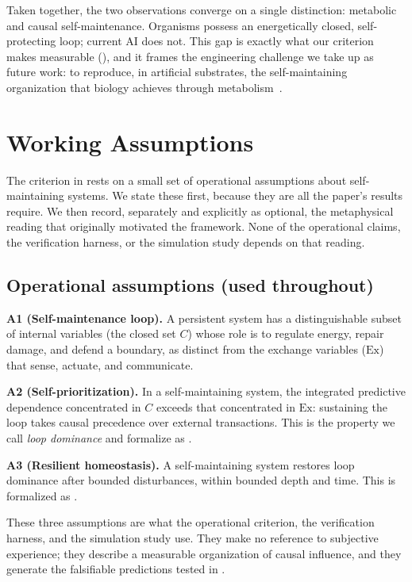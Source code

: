 \documentclass[11pt]{article}
\begin{document}
Taken together, the two observations converge on a single distinction: metabolic and causal self-maintenance. Organisms possess an energetically closed, self-protecting loop; current AI does not. This gap is exactly what our criterion makes measurable (), and it frames the engineering challenge we take up as future work: to reproduce, in artificial substrates, the self-maintaining organization that biology achieves through metabolism~\cite{maturana1980autopoiesis}.

\section{Working Assumptions}
\label{sec:postulates}

The criterion in  rests on a small set of operational assumptions about self-maintaining systems. We state these first, because they are all the paper's results require. We then record, separately and explicitly as optional, the metaphysical reading that originally motivated the framework. None of the operational claims, the verification harness, or the simulation study depends on that reading.

\subsection{Operational assumptions (used throughout)}
\label{sec:operational_assumptions}

\textbf{A1 (Self-maintenance loop).} A persistent system has a distinguishable subset of internal variables (the closed set $C$) whose role is to regulate energy, repair damage, and defend a boundary, as distinct from the exchange variables ($\text{Ex}$) that sense, actuate, and communicate.

\textbf{A2 (Self-prioritization).} In a self-maintaining system, the integrated predictive dependence concentrated in $C$ exceeds that concentrated in $\text{Ex}$: sustaining the loop takes causal precedence over external transactions. This is the property we call \emph{loop dominance} and formalize as \NC.

\textbf{A3 (Resilient homeostasis).} A self-maintaining system restores loop dominance after bounded disturbances, within bounded depth and time. This is formalized as \SC.

These three assumptions are what the operational criterion, the verification harness, and the simulation study use. They make no reference to subjective experience; they describe a measurable organization of causal influence, and they generate the falsifiable predictions tested in .
\end{document}
